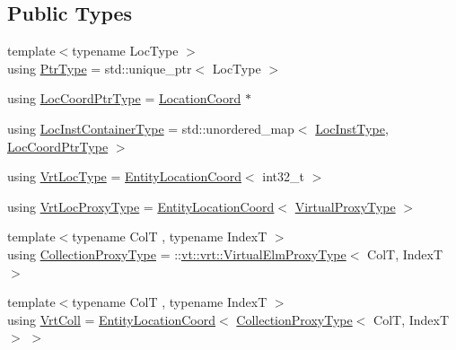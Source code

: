 \subsection*{Public Types}
\begin{DoxyCompactItemize}
\item 
{\footnotesize template$<$typename Loc\+Type $>$ }\\using \hyperlink{structvt_1_1location_1_1_location_manager_a32d8bca6ed6909a2190286408335d3b4}{Ptr\+Type} = std\+::unique\+\_\+ptr$<$ Loc\+Type $>$
\item 
using \hyperlink{structvt_1_1location_1_1_location_manager_a98ed824c058080e538546fc731cb8f4c}{Loc\+Coord\+Ptr\+Type} = \hyperlink{structvt_1_1location_1_1_location_coord}{Location\+Coord} $\ast$
\item 
using \hyperlink{structvt_1_1location_1_1_location_manager_adf4df6480ad89271a802d6d59bcf424e}{Loc\+Inst\+Container\+Type} = std\+::unordered\+\_\+map$<$ \hyperlink{namespacevt_1_1location_a4db6456e8024af2d23fc5ae560fef866}{Loc\+Inst\+Type}, \hyperlink{structvt_1_1location_1_1_location_manager_a98ed824c058080e538546fc731cb8f4c}{Loc\+Coord\+Ptr\+Type} $>$
\item 
using \hyperlink{structvt_1_1location_1_1_location_manager_a06ec1698d93780afdf7873eeaa3a77b6}{Vrt\+Loc\+Type} = \hyperlink{structvt_1_1location_1_1_entity_location_coord}{Entity\+Location\+Coord}$<$ int32\+\_\+t $>$
\item 
using \hyperlink{structvt_1_1location_1_1_location_manager_a3e410c85f5790a526a4eda22a9cc7881}{Vrt\+Loc\+Proxy\+Type} = \hyperlink{structvt_1_1location_1_1_entity_location_coord}{Entity\+Location\+Coord}$<$ \hyperlink{namespacevt_a1b417dd5d684f045bb58a0ede70045ac}{Virtual\+Proxy\+Type} $>$
\item 
{\footnotesize template$<$typename ColT , typename IndexT $>$ }\\using \hyperlink{structvt_1_1location_1_1_location_manager_add8d70c599ff0f03bc7a0d7eaed249d0}{Collection\+Proxy\+Type} = \+::\hyperlink{namespacevt_1_1vrt_a620a5c8c59d13e513f690c74b4af516f}{vt\+::vrt\+::\+Virtual\+Elm\+Proxy\+Type}$<$ ColT, IndexT $>$
\item 
{\footnotesize template$<$typename ColT , typename IndexT $>$ }\\using \hyperlink{structvt_1_1location_1_1_location_manager_a189fc3b436520c19aada9623a6b4a42e}{Vrt\+Coll} = \hyperlink{structvt_1_1location_1_1_entity_location_coord}{Entity\+Location\+Coord}$<$ \hyperlink{structvt_1_1location_1_1_location_manager_add8d70c599ff0f03bc7a0d7eaed249d0}{Collection\+Proxy\+Type}$<$ ColT, IndexT $>$ $>$

\end{DoxyCompactItemize}
